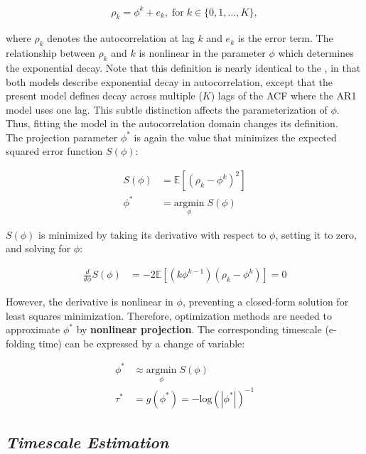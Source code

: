 \documentclass[main.tex]{subfiles}
\begin{document}
\begin{align}\label{eq:nlm}
    \rho_k = \phi^k + e_k, \; \text{for}\; k \in \{0, 1, ..., K\},
\end{align}

\noindent where $\rho_k$ denotes the autocorrelation at lag $k$ and $e_k$ is the error term. The relationship between $\rho_k$ and $k$ is nonlinear in the parameter $\phi$ which determines the exponential decay. Note that this definition is nearly identical to the , in that both models describe exponential decay in autocorrelation, except that the present model defines decay across multiple ($K$) lags of the ACF where the AR1 model uses one lag. This subtle distinction affects the parameterization of $\phi$. Thus, fitting the model in the autocorrelation domain changes its definition.\\

The projection parameter $\phi^*$ is again the value that minimizes the expected squared error function $S(\phi)$:

\begin{align}
    S(\phi) &= \mathbb{E}[(\rho_k - \phi^k)^2]\\
    \phi^* &= \underset{\phi}{\text{argmin}} \; S(\phi)
\end{align}

\noindent $S(\phi)$ is minimized by taking its derivative with respect to $\phi$, setting it to zero, and solving for $\phi$:

\begin{align}
    \frac{d}{d\phi} S(\phi) &= -2\mathbb{E}[(k\phi^{k-1})(\rho_k - \phi^k)] = 0
\end{align}

\noindent However, the derivative is nonlinear in $\phi$, preventing a closed-form solution for least squares minimization. Therefore, optimization methods are needed to approximate $\phi^*$ by \textbf{nonlinear projection}. The corresponding timescale (e-folding time) can be expressed by a change of variable:

\begin{align}
    \phi^* &\approx \underset{\phi}{\text{argmin}} \; S(\phi) \label{eq:nlm-phi}\\
    \tau^* &= g(\phi^*) = -{\text{log}(|\phi^*|)}^{-1} \label{eq:ar1-tau}
\end{align}

\subsection{\textit{Timescale Estimation}}
\end{document}
